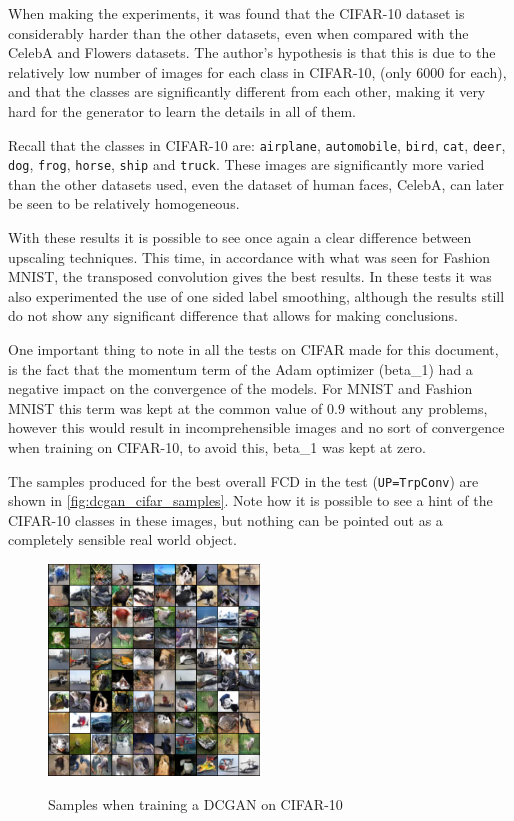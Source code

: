 When making the experiments, it was found that the \gls{CIFAR}-10 dataset is considerably harder than the other datasets, even when compared with the CelebA and Flowers datasets. The author's hypothesis is that this is due to the relatively low number of images for each class in \gls{CIFAR}-10, (only $6000$ for each), and that the classes are significantly different from each other, making it very hard for the generator to learn the details in all of them.

Recall that the classes in \gls{CIFAR}-10 are: \texttt{airplane}, \texttt{automobile}, \texttt{bird}, \texttt{cat}, \texttt{deer}, \texttt{dog}, \texttt{frog}, \texttt{horse}, \texttt{ship} and \texttt{truck}. These images are significantly more varied than the other datasets used, even the dataset of human faces, CelebA, can later be seen to be relatively homogeneous.

With these results it is possible to see once again a clear difference between upscaling techniques. This time, in accordance with what was seen for Fashion MNIST, the transposed convolution gives the best results. In these tests it was also experimented the use of one sided label smoothing, although the results still do not show any significant difference that allows for making conclusions.

One important thing to note in all the tests on CIFAR made for this document, is the fact that the momentum term of the Adam optimizer (\gls{beta_1}) had a negative impact on the convergence of the models. For \gls{MNIST} and Fashion MNIST this term was kept at the common value of $0.9$ without any problems, however this would result in incomprehensible images and no sort of convergence when training on \gls{CIFAR}-10, to avoid this, \gls{beta_1} was kept at zero.

The samples produced for the best overall \gls{FCD} in the test (\texttt{UP=TrpConv}) are shown in \autoref{fig:dcgan_cifar_samples}. Note how it is possible to see a hint of the \gls{CIFAR}-10 classes in these images, but nothing can be pointed out as a completely sensible real world object.
\begin{figure}[hbt]
    \centering
    \caption{Samples when training a DCGAN on CIFAR-10}
    \includegraphics[width=0.5\textwidth]{chapters/Experiments/DCGAN/cifar_samples.png}
    \label{fig:dcgan_cifar_samples}
\end{figure}
